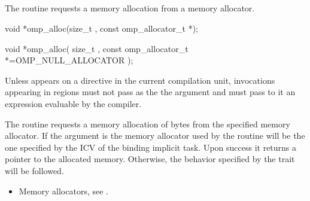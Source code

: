 \begin{ccppspecific}

\subsection{}
\label{subsec:omp_alloc}

\summary
The  routine requests a memory allocation from a memory allocator.

\format
\begin{cspecific}
\begin{ompcFunction}
void *omp_alloc(size_t , const omp_allocator_t *);
\end{ompcFunction}
\end{cspecific}
\begin{cppspecific}
\begin{ompcFunction}
void *omp_alloc(
  size_t ,
  const omp_allocator_t *=OMP_NULL_ALLOCATOR
);
\end{ompcFunction}
\end{cppspecific}

\constraints
Unless  appears on a  directive in the
current compilation unit,  invocations appearing in
 regions must not pass  as the the
 argument and must pass to it an expression evaluable by the
compiler.

\effect
The  routine requests a memory allocation of  
bytes from the specified memory allocator. If the  argument 
is  the memory allocator used by the routine will 
be the one specified by the  ICV of the binding 
implicit task. Upon success it returns a pointer to the allocated memory. 
Otherwise, the behavior specified by the  trait will be followed.

\crossreferences
\begin{itemize}
\item Memory allocators, see .
\end{itemize}



\subsection{}
\label{subsec:omp_free}


\end{ccppspecific}
